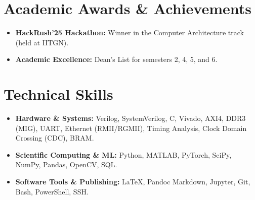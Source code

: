\documentclass[10pt,a4paper]{article}
\begin{document}
\section{Academic Awards \& Achievements}
\begin{itemize}
    \item \textbf{HackRush'25 Hackathon:} Winner in the Computer Architecture track (held at IITGN).
    \item \textbf{Academic Excellence:} Dean's List for semesters 2, 4, 5, and 6.
\end{itemize}

\section{Technical Skills}
\begin{itemize}[leftmargin=0pt, label={}]
    \item \textbf{Hardware \& Systems:} Verilog, SystemVerilog, C, Vivado, AXI4, DDR3 (MIG), UART, Ethernet (RMII/RGMII), Timing Analysis, Clock Domain Crossing (CDC), BRAM.
    \item \textbf{Scientific Computing \& ML:} Python, MATLAB, PyTorch, SciPy, NumPy, Pandas, OpenCV, SQL.
    \item \textbf{Software Tools \& Publishing:} LaTeX, Pandoc Markdown, Jupyter, Git, Bash, PowerShell, SSH.
\end{itemize}
\end{document}
